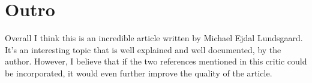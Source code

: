 \documentclass{article}
\begin{document}
\section*{Outro}
Overall I think this is an incredible article written by Michael Ejdal Lundsgaard. It's an interesting topic that is well explained and well documented, by the author. However, I believe that if the two references mentioned in this critic could be incorporated, it would even further improve the quality of the article.




\end{document}

